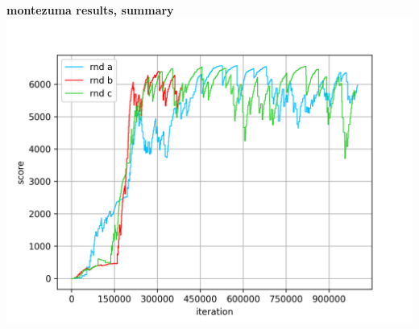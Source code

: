 \documentclass[xcolor=dvipsnames]{beamer}
\begin{document}
\begin{frame}{\bf montezuma results, summary}
  \centering
  \includegraphics[scale=0.5]{../results/summary.png}

\end{frame}
\end{document}
